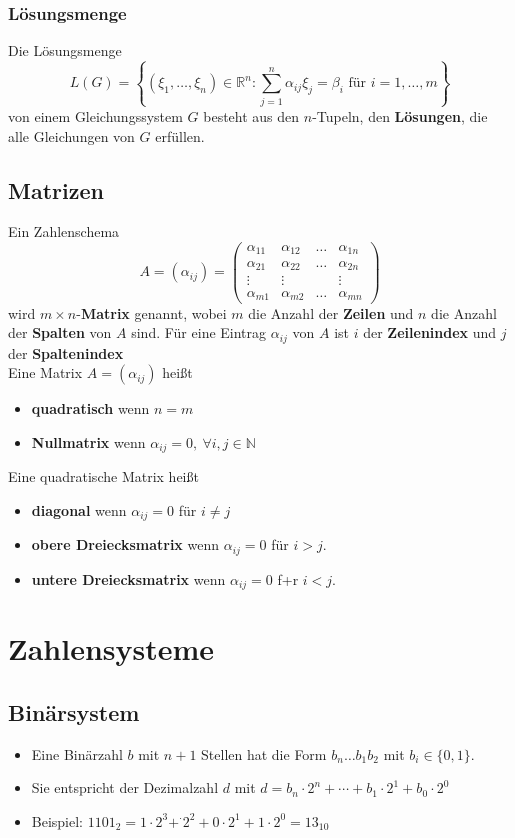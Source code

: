 \documentclass[12pt]{article}
\begin{document}
\subsubsection{Lösungsmenge}
Die Lösungsmenge
\[L(G) = \left\{(\xi_1, \dots, \xi_n) \in \mathbb{R}^n: \sum_{j=1}^{n} \alpha_{ij}\xi_{j} = \beta_i \text{ für } i = 1, \dots, m\right\}\]
von einem Gleichungssystem $G$ besteht aus den $n$-Tupeln, den \textbf{Lösungen}, die alle Gleichungen von $G$ erfüllen.

\newpage
\subsection{Matrizen}
Ein Zahlenschema
\[A = (\alpha_{ij}) = \begin{pmatrix}
    \alpha_{11} & \alpha_{12} & \dots & \alpha_{1n} \\
    \alpha_{21} & \alpha_{22} & \dots & \alpha_{2n} \\
    \vdots & \vdots & & \vdots \\
    \alpha_{m1} & \alpha_{m2} & \dots & \alpha_{mn}
\end{pmatrix}\]
wird $m \times n$-\textbf{Matrix} genannt, wobei $m$ die Anzahl der \textbf{Zeilen} und $n$ die Anzahl der \textbf{Spalten} von $A$ sind.
Für eine Eintrag $\alpha_{ij}$ von $A$ ist $i$ der \textbf{Zeilenindex} und $j$ der \textbf{Spaltenindex} \\
\newline
Eine Matrix $A = (\alpha_{ij})$ heißt
\begin{itemize}
    \item \textbf{quadratisch} wenn $n = m$
    \item \textbf{Nullmatrix} wenn $\alpha_{ij} = 0, \: \forall i,j \in \mathbb{N}$
\end{itemize}
Eine quadratische Matrix heißt
\begin{itemize}
    \item \textbf{diagonal} wenn $\alpha_{ij} = 0$ für $i \neq j$
    \item \textbf{obere Dreiecksmatrix} wenn $\alpha_{ij}= 0$ für $i > j$.
    \item \textbf{untere Dreiecksmatrix} wenn $\alpha_{ij} = 0$ f+r $i < j$.
\end{itemize}

\section{Zahlensysteme}
\subsection{Binärsystem}
\begin{itemize}[leftmargin=*]
    \item[] Eine Binärzahl $b$ mit $n + 1$ Stellen hat die Form $b_n\dots b_1 b_2$ mit $b_i \in \{0,1\}$.
    \item[] Sie entspricht der Dezimalzahl $d$ mit $d = b_n \cdot 2^n + \cdots + b_1 \cdot 2^1 + b_0 \cdot 2^0$ 
    \item[] Beispiel: $1101_2 = 1 \cdot 2^3 + ^\cdot 2^2 + 0 \cdot 2^1 + 1 \cdot 2^0 = 13_{10}$
\end{itemize}
\end{document}
